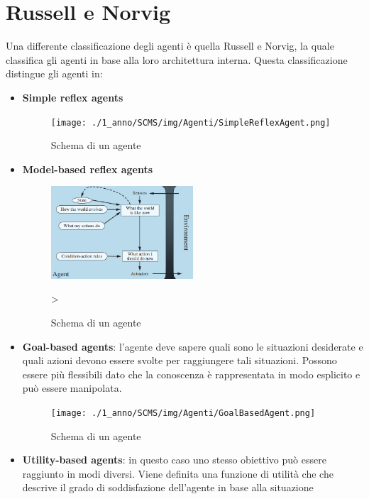 \section{Russell e Norvig}
Una differente classificazione degli agenti è quella Russell e Norvig, la quale
classifica gli agenti in base alla loro architettura interna. Questa classificazione
distingue gli agenti in:
\begin{itemize}
    \item \textbf{Simple reflex agents}
          \begin{figure}[!ht]
              \centering
              \texttt{[image: ./1\_anno/SCMS/img/Agenti/SimpleReflexAgent.png]}
              \caption{Schema di un agente}
              \label{fig:simpleReflex}
          \end{figure}
    \item \textbf{Model-based reflex agents}
          \begin{figure}
              \centering
              \includegraphics[width=0.5\textwidth]{./1_anno/SCMS/img/Agenti/ModelBasedReflexAgent.png}
              \caption{Schema di un agente}
              \label{fig:ModelReflex}>
          \end{figure}
    \item \textbf{Goal-based agents}: l'agente deve sapere quali sono le
          situazioni desiderate e quali azioni devono essere svolte per raggiungere
          tali situazioni. Possono essere più flessibili dato che la conoscenza
          è rappresentata in modo esplicito e può essere manipolata.
          \begin{figure}
              \centering
              \texttt{[image: ./1\_anno/SCMS/img/Agenti/GoalBasedAgent.png]}
              \caption{Schema di un agente}
              \label{fig:GoalBased}
          \end{figure}
    \item \textbf{Utility-based agents}: in questo caso uno stesso obiettivo può
          essere raggiunto in modi diversi. Viene definita una funzione di utilità che
          che descrive il grado di soddisfazione dell'agente in base alla situazione

\end{itemize}

